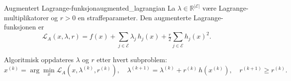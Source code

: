 \begin{definition}{Augmentert Lagrange-funksjon}{augmented_lagrangian}
    La \(\lambda\in\mathbb R^{|\mathcal E|}\) være Lagrange-multiplikatorer og \(r>0\) en straffeparameter. Den augmenterte Lagrange-funksjonen er
    \[
        \mathcal L_A(x,\lambda,r)
        = f(x)
        + \sum_{j\in\mathcal E}\lambda_j\,h_j(x)
        + \tfrac r2\sum_{j\in\mathcal E} h_j(x)^2.
    \]
\end{definition}

Algoritmisk oppdateres \(\lambda\) og \(r\) etter hvert subproblem:
\[
    x^{(k)} = \arg\min_x \mathcal L_A(x,\lambda^{(k)},r^{(k)}),
    \quad
    \lambda^{(k+1)} = \lambda^{(k)} + r^{(k)}\,h(x^{(k)}),
    \quad
    r^{(k+1)} \ge r^{(k)}.
\]



